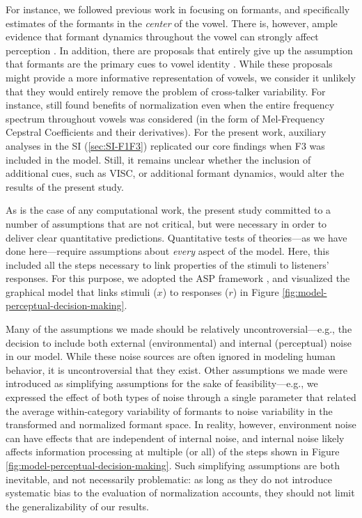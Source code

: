 \documentclass[preprint]{JASA}
\begin{document}
For instance, we followed previous work in focusing on formants, and specifically estimates of the formants in the \emph{center} of the vowel. There is, however, ample evidence that formant dynamics throughout the vowel can strongly affect perception \citep{assmann-katz2005, hillenbrand-nearey1999, nearey-assmann1986}. In addition, there are proposals that entirely give up the assumption that formants are the primary cues to vowel identity \citep[e.g., whole-spectrum accounts,][]{hillenbrand2006}. While these proposals might provide a more informative representation of vowels, we consider it unlikely that they would entirely remove the problem of cross-talker variability. For instance, \citet{richter2017} still found benefits of normalization even when the entire frequency spectrum throughout vowels was considered (in the form of Mel-Frequency Cepstral Coefficients and their derivatives). For the present work, auxiliary analyses in the SI (\ref{sec:SI-F1F3}) replicated our core findings when F3 was included in the model. Still, it remains unclear whether the inclusion of additional cues, such as VISC, or additional formant dynamics, would alter the results of the present study.

As is the case of any computational work, the present study committed to a number of assumptions that are not critical, but were necessary in order to deliver clear quantitative predictions. Quantitative tests of theories---as we have done here---require assumptions about \emph{every} aspect of the model. Here, this included all the steps necessary to link properties of the stimuli to listeners' responses. For this purpose, we adopted the ASP framework \citep{xie2023}, and visualized the graphical model that links stimuli (\(x\)) to responses (\(r\)) in Figure \ref{fig:model-perceptual-decision-making}.

Many of the assumptions we made should be relatively uncontroversial---e.g., the decision to include both external (environmental) and internal (perceptual) noise in our model. While these noise sources are often ignored in modeling human behavior, it is uncontroversial that they exist. Other assumptions we made were introduced as simplifying assumptions for the sake of feasibility---e.g., we expressed the effect of both types of noise through a single parameter that related the average within-category variability of formants to noise variability in the transformed and normalized formant space. In reality, however, environment noise can have effects that are independent of internal noise, and internal noise likely affects information processing at multiple (or all) of the steps shown in Figure \ref{fig:model-perceptual-decision-making}. Such simplifying assumptions are both inevitable, and not necessarily problematic: as long as they do not introduce systematic bias to the evaluation of normalization accounts, they should not limit the generalizability of our results.
\end{document}
